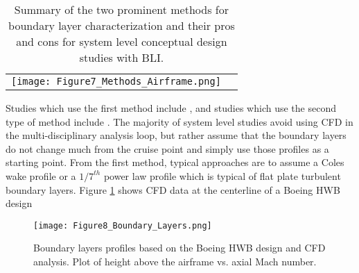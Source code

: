 \begin{table}[ht]
\caption{Summary of the two prominent methods for boundary layer characterization and their pros and cons for system level conceptual design studies with BLI.}
\centering
\begin{tabular}{cc}
\texttt{[image: Figure7\_Methods\_Airframe.png]}
\end{tabular}
\label{Methods_Airframe}
\end{table}

Studies which use the first method include \cite{Sato2011} \cite{Plas2007}, and studies which use the second type of method include  \cite{Felder2011} \cite{Hardin2012} \cite{Kawai2006}.  The majority of system level studies avoid using CFD in the multi-disciplinary analysis loop, but rather assume that the boundary layers do not change much from the cruise point and simply use those profiles as a starting point.  From the first method, typical approaches are to assume a Coles wake profile or a $1/7^{th}$ power law profile which is typical of flat plate turbulent boundary layers.  Figure \ref{Boundary_Layer_Profiles} shows CFD data at the centerline of a Boeing HWB design \cite{Felder2011}
	\begin{figure}
	\centering
	\texttt{[image: Figure8\_Boundary\_Layers.png]}
	\caption{Boundary layers profiles based on the Boeing HWB design and CFD analysis.  Plot of height above the airframe vs. axial Mach number. \cite{Fedler2011}}
	\label{Boundary_Layer_Profiles}
	\end{figure}
